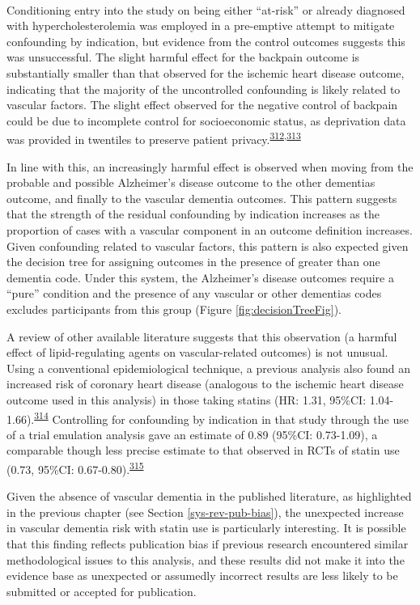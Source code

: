 \documentclass[a4paper, twoside]{templates/ociamthesis}
\begin{document}
~

Conditioning entry into the study on being either ``at-risk'' or already diagnosed with hypercholesterolemia was employed in a pre-emptive attempt to mitigate confounding by indication, but evidence from the control outcomes suggests this was unsuccessful. The slight harmful effect for the backpain outcome is substantially smaller than that observed for the ischemic heart disease outcome, indicating that the majority of the uncontrolled confounding is likely related to vascular factors. The slight effect observed for the negative control of backpain could be due to incomplete control for socioeconomic status, as deprivation data was provided in twentiles to preserve patient privacy.\textsuperscript{\protect\hyperlink{ref-boruzs2016}{312},\protect\hyperlink{ref-ikeda2019}{313}}

In line with this, an increasingly harmful effect is observed when moving from the probable and possible Alzheimer's disease outcome to the other dementias outcome, and finally to the vascular dementia outcomes. This pattern suggests that the strength of the residual confounding by indication increases as the proportion of cases with a vascular component in an outcome definition increases. Given confounding related to vascular factors, this pattern is also expected given the decision tree for assigning outcomes in the presence of greater than one dementia code. Under this system, the Alzheimer's disease outcomes require a ``pure'' condition and the presence of any vascular or other dementias codes excludes participants from this group (Figure \ref{fig:decisionTreeFig}).

A review of other available literature suggests that this observation (a harmful effect of lipid-regulating agents on vascular-related outcomes) is not unusual. Using a conventional epidemiological technique, a previous analysis also found an increased risk of coronary heart disease (analogous to the ischemic heart disease outcome used in this analysis) in those taking statins (HR: 1.31, 95\%CI: 1.04-1.66).\textsuperscript{\protect\hyperlink{ref-danaei2013}{314}} Controlling for confounding by indication in that study through the use of a trial emulation analysis gave an estimate of 0.89 (95\%CI: 0.73-1.09), a comparable though less precise estimate to that observed in RCTs of statin use (0.73, 95\%CI: 0.67-0.80).\textsuperscript{\protect\hyperlink{ref-taylor2013}{315}}

Given the absence of vascular dementia in the published literature, as highlighted in the previous chapter (see Section \ref{sys-rev-pub-bias}), the unexpected increase in vascular dementia risk with statin use is particularly interesting. It is possible that this finding reflects publication bias if previous research encountered similar methodological issues to this analysis, and these results did not make it into the evidence base as unexpected or assumedly incorrect results are less likely to be submitted or accepted for publication.
\end{document}
